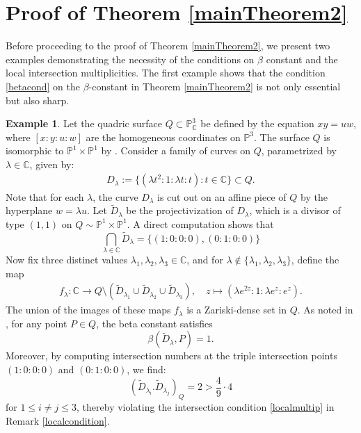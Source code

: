 \documentclass[10pt]{amsart}
\numberwithin{equation}{section}
\theoremstyle{plain}
\theoremstyle{definition}
\newtheorem{example}[theorem]{Example}
\begin{document}
\section{Proof of Theorem \ref{mainTheorem2}}\label{hyperbolic}
Before proceeding to the proof of Theorem \ref{mainTheorem2}, we present two examples demonstrating the necessity of the conditions on $\beta$ constant and the local intersection multiplicities. 
The first example shows that the condition \eqref{betacond} on the $\beta$-constant in Theorem \ref{mainTheorem2} is not only essential but also sharp.
\begin{example}
    Let the quadric surface $Q \subset \mathbb{P}^3_{\mathbb{C}}$ be defined by the equation $xy=uw$, where $[x:y:u:w]$ are the homogeneous coordinates on $\mathbb{P}^3$. The surface $Q$ is isomorphic to $\mathbb{P}^1 \times \mathbb{P}^1$ by \cite[Ex. I.2.15]{Har}. Consider a family of   curves  on $Q$,  parametrized by $\lambda \in \mathbb{C}$, given by:
    \begin{align*}
       D_{\lambda}:=\{(\lambda t^2:1:\lambda t:t): t\in\mathbb C\}\subset  Q .
    \end{align*}
    Note that for each $\lambda$, the curve $D_{\lambda}$ is cut out on an affine piece of $Q$ by the hyperplane $w=\lambda u$. Let $\tilde{D}_{\lambda}$ be the projectivization of $D_{\lambda}$, which is  a divisor of type $(1,1)$ on $Q\sim \mathbb{P}^1 \times \mathbb{P}^1$. A direct computation shows that
    \begin{equation*}
        \bigcap_{\lambda \in \mathbb{C}} \tilde{D}_{\lambda}= \{(1:0:0:0),(0:1:0:0)\}
    \end{equation*}
Now fix three distinct values $\lambda_1,\lambda_2,\lambda_3 \in \mathbb{C}$, and for  $\lambda\notin \{\lambda_1,\lambda_2,\lambda_3\}$, define the map
    \begin{align*}
        f_{\lambda} : \mathbb{C}  \to Q \setminus (\tilde{D}_{\lambda_1}\cup \tilde{D}_{\lambda_2}\cup \tilde{D}_{\lambda_{3}}), \quad
        z  \mapsto (\lambda  e^{2z}:1:\lambda e^z:e^z).
    \end{align*}
    The union of the images of these maps  $f_{\lambda}$  is a Zariski-dense set in $Q$.
  As noted in \cite[Example~5.12]{HLX}, for any point $P \in Q$,  the beta constant satisfies  
\begin{equation*}
        \beta(  \tilde{D}_{\lambda},P) =1. 
    \end{equation*}
Moreover, by computing  intersection numbers at the triple intersection points  $(1:0:0:0)$ and $(0:1:0:0)$, we find:
    \begin{equation*}
        ( \tilde{D}_{\lambda_i} .  \tilde{D}_{\lambda_j})_Q =2 > \frac{4}{9}\cdot 4 
    \end{equation*}
    for $1\le i\ne j\le 3$,  thereby violating the intersection condition \eqref{localmultip} in Remark \ref{localcondition}.
\end{example}
\end{document}
